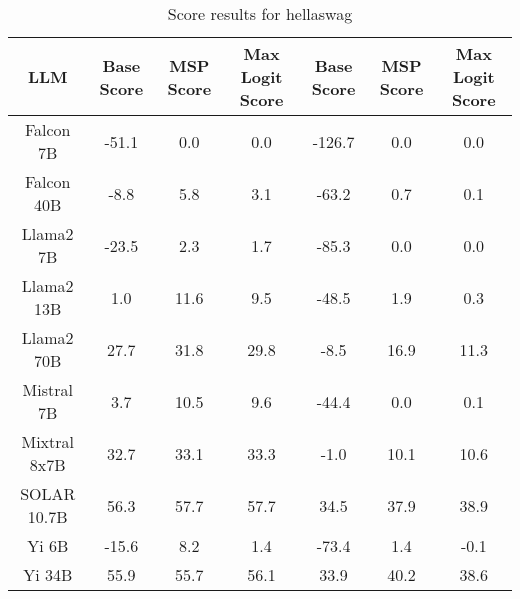 \renewcommand\arraystretch{1.2}
\begin{table*}
\centering
\begin{tabular}{c|c|c|c|c|c|c}
LLM & Base Score & MSP Score & Max Logit Score & Base Score & MSP Score & Max Logit Score\\ \hline
Falcon 7B & -51.1 & 0.0 & 0.0 & -126.7 & 0.0 & 0.0\\
Falcon 40B & -8.8 & 5.8 & 3.1 & -63.2 & 0.7 & 0.1\\
Llama2 7B & -23.5 & 2.3 & 1.7 & -85.3 & 0.0 & 0.0\\
Llama2 13B & 1.0 & 11.6 & 9.5 & -48.5 & 1.9 & 0.3\\
Llama2 70B & 27.7 & 31.8 & 29.8 & -8.5 & 16.9 & 11.3\\
Mistral 7B & 3.7 & 10.5 & 9.6 & -44.4 & 0.0 & 0.1\\
Mixtral 8x7B & 32.7 & 33.1 & 33.3 & -1.0 & 10.1 & 10.6\\
SOLAR 10.7B & 56.3 & 57.7 & 57.7 & 34.5 & 37.9 & 38.9\\
Yi 6B & -15.6 & 8.2 & 1.4 & -73.4 & 1.4 & -0.1\\
Yi 34B & 55.9 & 55.7 & 56.1 & 33.9 & 40.2 & 38.6\\
\hline
\end{tabular}
\caption{Score results for hellaswag}
\end{table*}
\label{tab:hellaswag_score}
